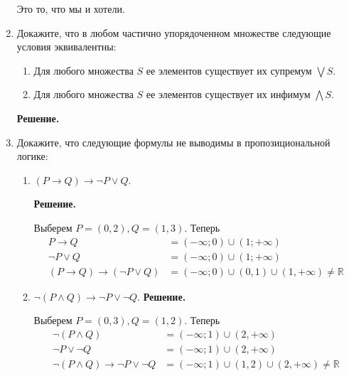 \begin{enumerate}
    Это то, что мы и хотели.

\item Докажите, что в любом частично упорядоченном множестве следующие условия эквивалентны:
\begin{enumerate}
\item Для любого множества $S$ ее элементов существует их супремум $\bigvee S$.
\item Для любого множества $S$ ее элементов существует их инфимум $\bigwedge S$.
\end{enumerate}

	\textbf{Решение.}
	
	

\item Докажите, что следующие формулы не выводимы в пропозициональной логике:
\begin{enumerate}
\item $(P \to Q) \to \neg P \lor Q$.

	\textbf{Решение.}
	
	Выберем $P = (0, 2), Q = (1, 3)$. Теперь 
	\begin{align*}
		P \to Q &= (-\infty; 0) \cup (1; +\infty) \\
		\neg P \lor Q &= (-\infty; 0) \cup (1; +\infty) \\
		(P \to Q) \to (\neg P \lor Q) &= (-\infty; 0) \cup (0, 1) \cup (1, +\infty) \neq \mathbb{R}
	\end{align*}
\item $\neg (P \land Q) \to \neg P \lor \neg Q$.
	\textbf{Решение.}
	
	Выберем $P = (0, 3), Q = (1, 2)$. Теперь
	\begin{align*}
		\neg (P \land Q) &= (-\infty; 1) \cup (2, +\infty) \\
		\neg P \lor \neg Q &= (-\infty; 1) \cup (2, +\infty) \\
		\neg (P \land Q) \to \neg P \lor \neg Q &= (-\infty; 1) \cup (1, 2) \cup (2, +\infty) \neq \mathbb{R}
	\end{align*}

\end{enumerate}

\end{enumerate}

